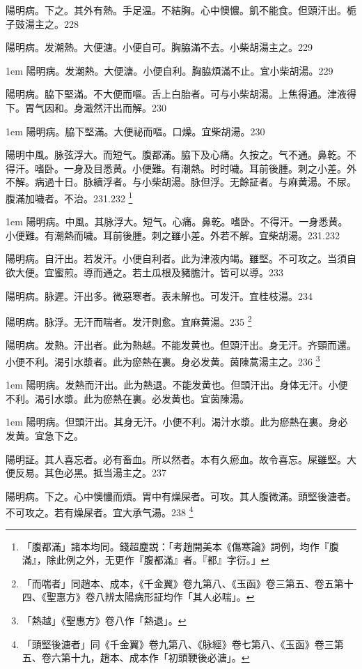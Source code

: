 陽明病。下之。其外有熱。手足温。不結胸。心中懊憹。飢不能食。但頭汗出。栀子{\khaai 豉}湯主之。228

陽明病。发潮熱。大便溏。小便自可。胸脇滿不去。小柴胡湯主之。229

\hangindent 1em
陽明病。发潮熱。大便溏。小便自利。胸脇煩滿不止。宜小柴胡湯。{\shenghui}229

陽明病。脇下堅滿。不大便而嘔。舌上{\khaai 白}胎者。可与小柴胡湯。上焦得通。津液得下。胃气因和。身濈然汗出而解。230

\hangindent 1em
陽明病。脇下堅滿。大便祕而嘔。口燥。宜柴胡湯。{\shenghui}230

陽明中風。脉弦浮大。而短气。腹都滿。脇下及心痛。久按之。气不通。鼻乾。不得汗。嗜卧。一身及目悉黄。小便難。有潮熱。时时噦。耳前後腫。刺之小差。外不解。病過十日。脉續浮者。与{\khaai 小}柴胡湯。脉但浮。无餘証者。与麻黄湯。不尿。腹滿加噦者。不治。231.232
	\footnote{
		「腹都滿」諸本均同。錢超塵説：「考趙開美本《傷寒論》詞例，均作『腹滿』，除此例之外，无更作『腹都滿』者。『都』字衍。」
	}

\hangindent 1em
陽明病。中風。其脉浮大。短气。心痛。鼻乾。嗜卧。不得汗。一身悉黄。小便難。有潮熱而噦。耳前後腫。刺之雖小差。外若不解。宜柴胡湯。{\shenghui}231.232

陽明病。{\khaai 自}汗出。若发汗。小便自利者。此为{\khaai 津液}内竭。雖堅。不可攻之。当須自欲大便。宜蜜煎。導而通之。若土瓜根及豬膽汁。皆可以導。233

陽明病。脉遲。汗出多。微惡寒者。表未解也。可发汗。宜桂枝湯。234

陽明病。脉浮。无汗而喘者。发汗則愈。宜麻黄湯。235
	\footnote{
		「而喘者」同趙本、成本，《千金翼》卷九第八、《玉函》卷三第五、卷五第十四、《聖惠方》卷八辨太陽病形証均作「其人必喘」。
	}

陽明病。发熱。汗出者。此为熱越。不能发黄也。但頭汗出。身无汗。齐頸而還。小便不利。渴引水漿者。此为瘀熱在裏。身必发黄。茵陳{\khaai 蒿}湯主之。236
	\footnote{
		「熱越」《聖惠方》卷八作「熱退」。
	}

\hangindent 1em
陽明病。发熱而汗出。此为熱退。不能发黄也。但頭汗出。身体无汗。小便不利。渴引水漿。此为瘀熱在裏。必发黄也。宜茵陳湯。{\shenghui}

\hangindent 1em
陽明病。但頭汗出。其身无汗。小便不利。渴汁水漿。此为瘀熱在裏。身必发黄。宜急下之。{\shenghui}

陽明証。其人喜忘者。必有畜血。所以然者。本有久瘀血。故令喜忘。屎雖堅。大便反易。其色必黑。抵当湯主之。237

陽明病。下之。心中懊憹而煩。胃中有燥屎者。可攻。其人腹微滿。頭堅後溏者。不可攻之。若有燥屎者。宜{\khaai 大}承气湯。238
	\footnote{
		「頭堅後溏者」同《千金翼》卷九第八、《脉經》卷七第八、《玉函》卷三第五、卷六第十九，趙本、成本作「初頭鞕後必溏」。
	}

